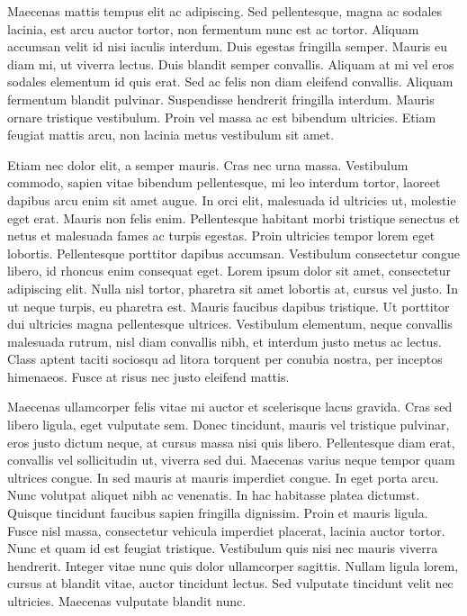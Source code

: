 Maecenas mattis tempus elit ac adipiscing.
Sed pellentesque, magna ac sodales lacinia, est arcu auctor tortor, non fermentum nunc est ac tortor.
Aliquam accumsan velit id nisi iaculis interdum.
Duis egestas fringilla semper.
Mauris eu diam mi, ut viverra lectus.
Duis blandit semper convallis.
Aliquam at mi vel eros sodales elementum id quis erat.
Sed ac felis non diam eleifend convallis.
Aliquam fermentum blandit pulvinar.
Suspendisse hendrerit fringilla interdum.
Mauris ornare tristique vestibulum.
Proin vel massa ac est bibendum ultricies.
Etiam feugiat mattis arcu, non lacinia metus vestibulum sit amet.

Etiam nec dolor elit, a semper mauris.
Cras nec urna massa.
Vestibulum commodo, sapien vitae bibendum pellentesque, mi leo interdum tortor, laoreet dapibus arcu enim sit amet augue.
In orci elit, malesuada id ultricies ut, molestie eget erat.
Mauris non felis enim.
Pellentesque habitant morbi tristique senectus et netus et malesuada fames ac turpis egestas.
Proin ultricies tempor lorem eget lobortis.
Pellentesque porttitor dapibus accumsan.
Vestibulum consectetur congue libero, id rhoncus enim consequat eget.
Lorem ipsum dolor sit amet, consectetur adipiscing elit.
Nulla nisl tortor, pharetra sit amet lobortis at, cursus vel justo.
In ut neque turpis, eu pharetra est.
Mauris faucibus dapibus tristique.
Ut porttitor dui ultricies magna pellentesque ultrices.
Vestibulum elementum, neque convallis malesuada rutrum, nisl diam convallis nibh, et interdum justo metus ac lectus.
Class aptent taciti sociosqu ad litora torquent per conubia nostra, per inceptos himenaeos.
Fusce at risus nec justo eleifend mattis.

Maecenas ullamcorper felis vitae mi auctor et scelerisque lacus gravida.
Cras sed libero ligula, eget vulputate sem.
Donec tincidunt, mauris vel tristique pulvinar, eros justo dictum neque, at cursus massa nisi quis libero.
Pellentesque diam erat, convallis vel sollicitudin ut, viverra sed dui.
Maecenas varius neque tempor quam ultrices congue.
In sed mauris at mauris imperdiet congue.
In eget porta arcu.
Nunc volutpat aliquet nibh ac venenatis.
In hac habitasse platea dictumst.
Quisque tincidunt faucibus sapien fringilla dignissim.
Proin et mauris ligula.
Fusce nisl massa, consectetur vehicula imperdiet placerat, lacinia auctor tortor.
Nunc et quam id est feugiat tristique.
Vestibulum quis nisi nec mauris viverra hendrerit.
Integer vitae nunc quis dolor ullamcorper sagittis.
Nullam ligula lorem, cursus at blandit vitae, auctor tincidunt lectus.
Sed vulputate tincidunt velit nec ultricies.
Maecenas vulputate blandit nunc.

